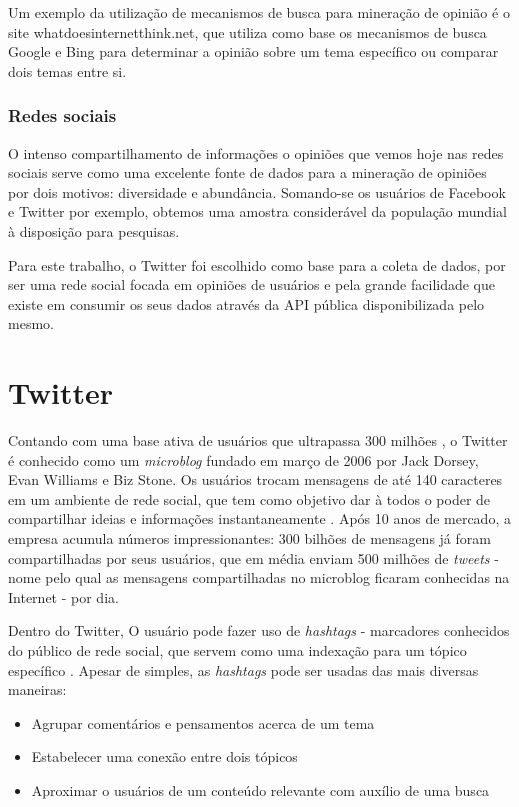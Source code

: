 Um exemplo da utilização de mecanismos de busca para mineração de opinião é o site whatdoesinternetthink.net\cite{whatdoesinternetthink}, que utiliza como base os mecanismos de busca Google e Bing para determinar a opinião sobre um tema específico ou comparar dois temas entre si.

\subsubsection{Redes sociais}

O intenso compartilhamento de informações o opiniões que vemos hoje nas redes sociais serve como uma excelente fonte de dados para a mineração de opiniões por dois motivos: diversidade e abundância. Somando-se os usuários de Facebook e Twitter por exemplo, obtemos uma amostra considerável da população mundial à disposição para pesquisas.

Para este trabalho, o Twitter foi escolhido como base para a coleta de dados, por ser uma rede social focada em opiniões de usuários e pela grande facilidade que existe em consumir os seus dados através da API pública disponibilizada pelo mesmo.

\section{Twitter}\label{sec:twitter}

Contando com uma base ativa de usuários que ultrapassa 300 milhões \cite{twittercompany2016}, o Twitter é conhecido como um \emph{microblog} fundado em março de 2006 por Jack Dorsey, Evan Williams e Biz Stone. Os usuários trocam mensagens de até 140 caracteres \cite{twittercharlimit2016} em um ambiente de rede social, que tem como objetivo dar à todos o poder de compartilhar ideias e informações instantaneamente \cite{twittercompany2016}. Após 10 anos de mercado, a empresa acumula números impressionantes: 300 bilhões de mensagens já foram compartilhadas por seus usuários, que em média enviam 500 milhões de \emph{tweets} \cite{twitterstats2016} - nome pelo qual as mensagens compartilhadas no microblog ficaram conhecidas na Internet - por dia.

Dentro do Twitter, O usuário pode fazer uso de \emph{hashtags} - marcadores conhecidos do público de rede social, que servem como uma indexação para um tópico específico \cite{waite2012paperback}. Apesar de simples, as \emph{hashtags} pode ser usadas das mais diversas maneiras:
\begin{itemize}
\item Agrupar comentários e pensamentos acerca de um tema
\item Estabelecer uma conexão entre dois tópicos
\item Aproximar o usuários de um conteúdo relevante com auxílio de uma busca
\end{itemize}

